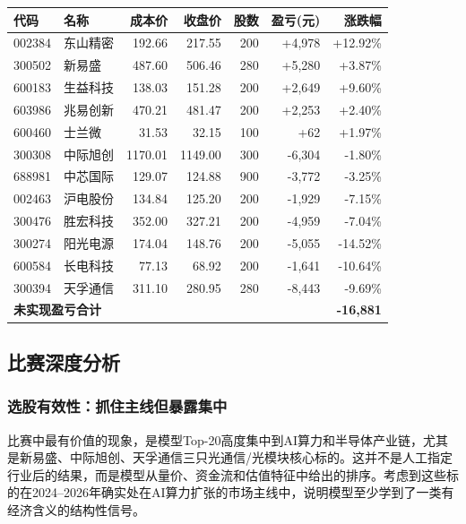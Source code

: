 \documentclass[10pt,a4paper]{ctexart}
\begin{document}
\begin{center}
    \small
    \begin{tabular}{llrrrrr}
        \toprule
        代码 & 名称 & 成本价 & 收盘价 & 股数 & 盈亏(元) & 涨跌幅 \\
        \midrule
        002384 & 东山精密 & 192.66 & 217.55 & 200 & +4,978 & +12.92\% \\
        300502 & 新易盛 & 487.60 & 506.46 & 280 & +5,280 & +3.87\% \\
        600183 & 生益科技 & 138.03 & 151.28 & 200 & +2,649 & +9.60\% \\
        603986 & 兆易创新 & 470.21 & 481.47 & 200 & +2,253 & +2.40\% \\
        600460 & 士兰微 & 31.53 & 32.15 & 100 & +62 & +1.97\% \\
        300308 & 中际旭创 & 1170.01 & 1149.00 & 300 & -6,304 & -1.80\% \\
        688981 & 中芯国际 & 129.07 & 124.88 & 900 & -3,772 & -3.25\% \\
        002463 & 沪电股份 & 134.84 & 125.20 & 200 & -1,929 & -7.15\% \\
        300476 & 胜宏科技 & 352.00 & 327.21 & 200 & -4,959 & -7.04\% \\
        300274 & 阳光电源 & 174.04 & 148.76 & 200 & -5,055 & -14.52\% \\
        600584 & 长电科技 & 77.13 & 68.92 & 200 & -1,641 & -10.64\% \\
        300394 & 天孚通信 & 311.10 & 280.95 & 280 & -8,443 & -9.69\% \\
        \midrule
        \multicolumn{6}{l}{\textbf{未实现盈亏合计}} & \textbf{-16,881} \\
        \bottomrule
    \end{tabular}
\end{center}

\subsection{比赛深度分析}

\subsubsection{选股有效性：抓住主线但暴露集中}

比赛中最有价值的现象，是模型Top-20高度集中到AI算力和半导体产业链，尤其是新易盛、中际旭创、天孚通信三只光通信/光模块核心标的。这并不是人工指定行业后的结果，而是模型从量价、资金流和估值特征中给出的排序。考虑到这些标的在2024--2026年确实处在AI算力扩张的市场主线中，说明模型至少学到了一类有经济含义的结构性信号。
\end{document}
